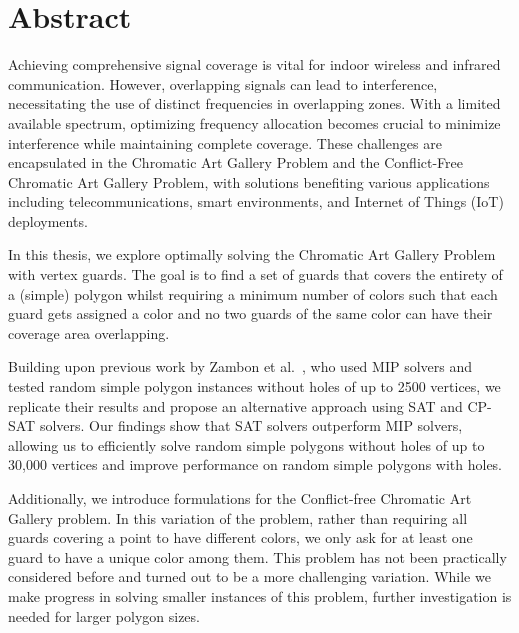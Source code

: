 \chapter*{Abstract}
Achieving comprehensive signal coverage is vital for indoor wireless and infrared communication. However, overlapping signals can lead to interference, necessitating the use of distinct frequencies in overlapping zones. With a limited available spectrum, optimizing frequency allocation becomes crucial to minimize interference while maintaining complete coverage. These challenges are encapsulated in the Chromatic Art Gallery Problem and the Conflict-Free Chromatic Art Gallery Problem, with solutions benefiting various applications including telecommunications, smart environments, and Internet of Things (IoT) deployments.

In this thesis, we explore optimally solving the Chromatic Art Gallery Problem with vertex guards. The goal is to find a set of guards that covers the entirety of a (simple) polygon whilst requiring a minimum number of colors such that each guard gets assigned a color and no two guards of the same color can have their coverage area overlapping.

Building upon previous work by Zambon et al.~\cite{zambon2014exact}, who used MIP solvers and tested random simple polygon instances without holes of up to 2500 vertices, we replicate their results and propose an alternative approach using SAT and CP-SAT solvers. Our findings show that SAT solvers outperform MIP solvers, allowing us to efficiently solve random simple polygons without holes of up to 30,000 vertices and improve performance on random simple polygons with holes. 

Additionally, we introduce formulations for the Conflict-free Chromatic Art Gallery problem. In this variation of the problem, rather than requiring all guards covering a point to have different colors, we only ask for at least one guard to have a unique color among them. This problem has not been practically considered before and turned out to be a more challenging variation. While we make progress in solving smaller instances of this problem, further investigation is needed for larger polygon sizes.
